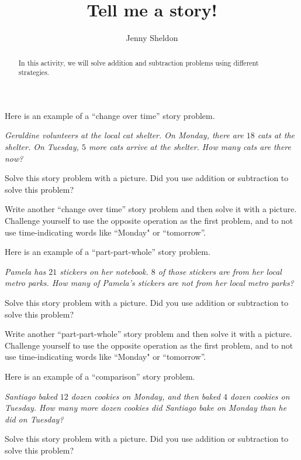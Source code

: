 \documentclass[nooutcomes,noauthor,handout]{ximera}
\title{Tell me a story!}
\author{Jenny Sheldon}
\begin{document}
\begin{abstract} In this activity, we will solve addition and subtraction problems using different strategies. \end{abstract}
\maketitle



\begin{problem}
Here is an example of a ``change over time'' story problem. 

\emph{Geraldine volunteers at the local cat shelter. On Monday, there are $18$ cats at the shelter. On Tuesday, $5$ more cats arrive at the shelter. How many cats are there now?}

Solve this story problem with a picture. Did you use addition or subtraction to solve this problem?
\end{problem}

\begin{problem}
Write another ``change over time'' story problem and then solve it with a picture. Challenge yourself to use the opposite operation as the first problem, and to not use time-indicating words like ``Monday" or ``tomorrow''.
\end{problem}


\begin{problem}
Here is an example of a ``part-part-whole'' story problem. 

\emph{Pamela has $21$ stickers on her notebook. $8$ of those stickers are from her local metro parks. How many of Pamela's stickers are not from her local metro parks?}

Solve this story problem with a picture. Did you use addition or subtraction to solve this problem?
\end{problem}

\begin{problem}
Write another ``part-part-whole'' story problem and then solve it with a picture. Challenge yourself to use the opposite operation as the first problem, and to not use time-indicating words like ``Monday" or ``tomorrow''.
\end{problem}

\begin{problem}
Here is an example of a ``comparison'' story problem. 

\emph{Santiago baked $12$ dozen cookies on Monday, and then baked $4$ dozen cookies on Tuesday. How many more dozen cookies did Santiago bake on Monday than he did on Tuesday?}

Solve this story problem with a picture. Did you use addition or subtraction to solve this problem?
\end{problem}
\end{document}
